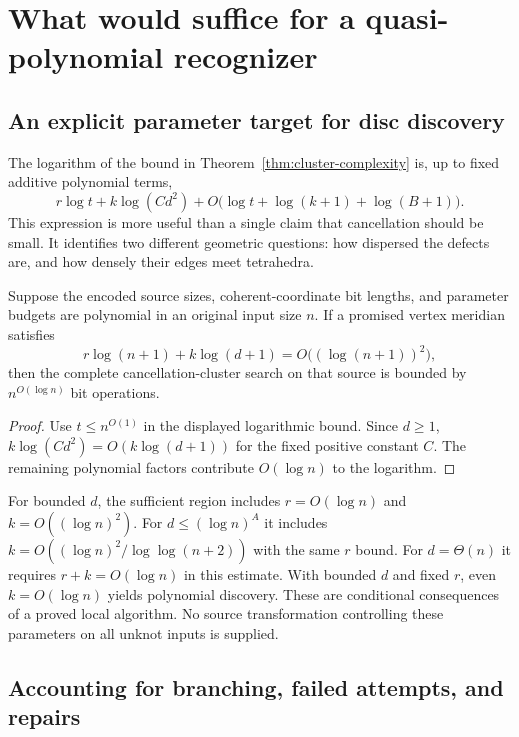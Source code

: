 \section{What would suffice for a quasi-polynomial recognizer}
\label{sec:global-budget}

\subsection{An explicit parameter target for disc discovery}

The logarithm of the bound in Theorem~\ref{thm:cluster-complexity} is, up to
fixed additive polynomial terms,
\[
 r\log t+k\log(Cd^2)+O\bigl(\log t+\log(k+1)+\log(B+1)\bigr).
\]
This expression is more useful than a single claim that cancellation should
be small. It identifies two different geometric questions: how dispersed the
defects are, and how densely their edges meet tetrahedra.

\begin{corollary}\label{cor:discovery-budget}
Suppose the encoded source sizes, coherent-coordinate bit lengths, and
parameter budgets are polynomial in an original input size $n$. If a promised
vertex meridian satisfies
\[
 r\log(n+1)+k\log(d+1)=O\bigl((\log(n+1))^2\bigr),
\]
then the complete cancellation-cluster search on that source is bounded by
$n^{O(\log n)}$ bit operations.
\end{corollary}
\begin{proof}
Use $t\leq n^{O(1)}$ in the displayed logarithmic bound. Since $d\geq1$,
$k\log(Cd^2)=O(k\log(d+1))$ for the fixed positive constant $C$. The
remaining polynomial factors contribute $O(\log n)$ to the logarithm.
\end{proof}

For bounded $d$, the sufficient region includes
$r=O(\log n)$ and $k=O((\log n)^2)$. For
$d\leq(\log n)^A$ it includes
$k=O((\log n)^2/\log\log(n+2))$ with the same $r$ bound.
For $d=\Theta(n)$ it requires $r+k=O(\log n)$ in this estimate. With
bounded $d$ and fixed $r$, even $k=O(\log n)$ yields polynomial discovery.
These are conditional consequences of a proved local algorithm. No source
transformation controlling these parameters on all unknot inputs is supplied.

\subsection{Accounting for branching, failed attempts, and repairs}

